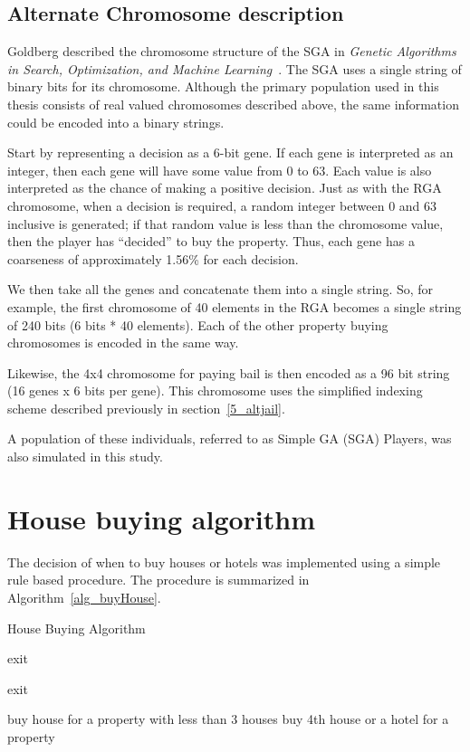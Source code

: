\subsection{Alternate Chromosome description} \label{5_altchromo}

Goldberg described the chromosome structure of the SGA in \emph{Genetic
Algorithms in Search, Optimization, and Machine
Learning}~\cite{goldberg1989genetic}. The SGA uses a single string of
binary bits for its chromosome. Although the primary population used in this thesis
consists of real valued chromosomes described above, the same information could
be encoded into a binary strings.

Start by representing a decision as a 6-bit gene. If each gene is interpreted as
an integer, then each gene will have some value from 0 to 63. Each value is also
interpreted as the chance of making a positive decision. Just as with the RGA
chromosome, when a decision is required, a random integer between 0 and 63
inclusive is generated; if that random value is less than the chromosome value,
then the player has ``decided'' to buy the property. Thus, each gene has a
coarseness of approximately 1.56\% for each decision.

We then take all the genes and concatenate them into a single string. So, for
example, the first chromosome of 40 elements in the RGA becomes a single string
of 240 bits (6 bits * 40 elements). Each of the other property buying
chromosomes is encoded in the same way.

Likewise, the 4x4 chromosome for paying bail is then encoded as a 96 bit string
(16 genes x 6 bits per gene). This chromosome uses the simplified indexing
scheme described previously in section~\ref{5_altjail}.

A population of these individuals, referred to as Simple GA (SGA) Players, was
also simulated in this study.

\section{House buying algorithm} \label{5_buy_house}

The decision of when to buy houses or hotels was implemented using a simple rule
based procedure. The procedure is summarized in Algorithm~\ref{alg_buyHouse}. 

\begin{algorithm}
\caption{House Buying Algorithm}
\label{alg_buyHouse}
\begin{algorithmic}
  \STATE exit
\ENDIF

  \STATE exit
\ENDIF

    \STATE buy house for a property with less than 3 houses
  \ELSE
    \STATE buy 4th house or a hotel for a property
  \ENDIF
\ENDWHILE
\end{algorithmic}
\end{algorithm}

